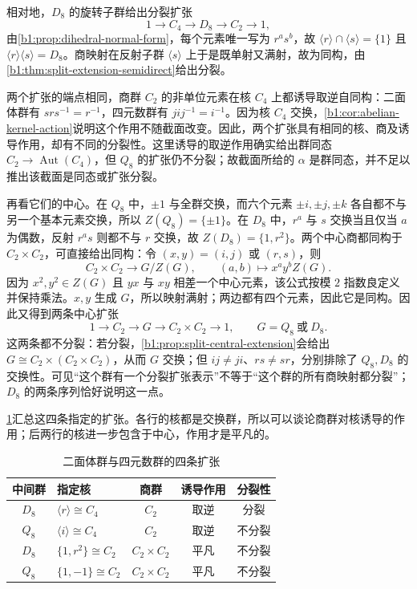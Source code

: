 \ProseParagraphBreak
相对地，\(D_8\) 的旋转子群给出分裂扩张
\[
	1\longrightarrow C_4\longrightarrow D_8\longrightarrow C_2\longrightarrow1,
\]
由\cref{b1:prop:dihedral-normal-form}，每个元素唯一写为 \(r^as^b\)，故 \(\langle r\rangle\cap\langle s\rangle=\{1\}\) 且 \(\langle r\rangle\langle s\rangle=D_8\)。商映射在反射子群 \(\langle s\rangle\) 上于是既单射又满射，故为同构，由\cref{b1:thm:split-extension-semidirect}给出分裂。

\ProseParagraphBreak
两个扩张的端点相同，商群 \(C_2\) 的非单位元素在核 \(C_4\) 上都诱导取逆自同构：二面体群有 \(srs^{-1}=r^{-1}\)，四元数群有 \(jij^{-1}=i^{-1}\)。因为核 \(C_4\) 交换，\cref{b1:cor:abelian-kernel-action}说明这个作用不随截面改变。因此，两个扩张具有相同的核、商及诱导作用，却有不同的分裂性。这里诱导的取逆作用确实给出群同态 \(C_2\rightarrow\operatorname{Aut}(C_4)\)，但 \(Q_8\) 的扩张仍不分裂；故截面所给的 \(\alpha\) 是群同态，并不足以推出该截面是同态或扩张分裂。

\ProseParagraphBreak
再看它们的中心。在 \(Q_8\) 中，\(\pm1\) 与全群交换，而六个元素 \(\pm i,\pm j,\pm k\) 各自都不与另一个基本元素交换，所以 \(Z(Q_8)=\{\pm1\}\)。在 \(D_8\) 中，\(r^a\) 与 \(s\) 交换当且仅当 \(a\) 为偶数，反射 \(r^as\) 则都不与 \(r\) 交换，故 \(Z(D_8)=\{1,r^2\}\)。两个中心商都同构于 \(C_2\times C_2\)，可直接给出同构：令 \((x,y)=(i,j)\) 或 \((r,s)\)，则
\[
	C_2\times C_2\longrightarrow G/Z(G),\qquad (a,b)\longmapsto x^ay^bZ(G).
\]
因为 \(x^2,y^2\in Z(G)\) 且 \(yx\) 与 \(xy\) 相差一个中心元素，该公式按模 \(2\) 指数良定义并保持乘法。\(x,y\) 生成 \(G\)，所以映射满射；两边都有四个元素，因此它是同构。因此又得到两条中心扩张
\[
	1\longrightarrow C_2\longrightarrow G \longrightarrow C_2\times C_2\longrightarrow1, \qquad G=Q_8\ \text{或}\ D_8.
\]
这两条都不分裂：若分裂，\cref{b1:prop:split-central-extension}会给出 \(G\cong C_2\times(C_2\times C_2)\)，从而 \(G\) 交换；但 \(ij\neq ji\)、\(rs\neq sr\)，分别排除了 \(Q_8,D_8\) 的交换性。可见“这个群有一个分裂扩张表示”不等于“这个群的所有商映射都分裂”；\(D_8\) 的两条序列恰好说明这一点。

\ProseParagraphBreak
\cref{b1:tab:dihedral-quaternion-extensions}汇总这四条指定的扩张。各行的核都是交换群，所以可以谈论商群对核诱导的作用；后两行的核进一步包含于中心，作用才是平凡的。

\begin{table}[htbp]
	\centering
	\caption{二面体群与四元数群的四条扩张}
	\label{b1:tab:dihedral-quaternion-extensions}
	\begin{tabularx}{\linewidth}{@{}c>{\raggedright\arraybackslash}Xccc@{}}
		\toprule
		中间群 & 指定核 & 商群 & 诱导作用 & 分裂性 \\
		\midrule
		\(D_8\) & \(\langle r\rangle\cong C_4\) & \(C_2\) & 取逆 & 分裂 \\
		\(Q_8\) & \(\langle i\rangle\cong C_4\) & \(C_2\) & 取逆 & 不分裂 \\
		\(D_8\) & \(\{1,r^2\}\cong C_2\) & \(C_2\times C_2\) & 平凡 & 不分裂 \\
		\(Q_8\) & \(\{1,-1\}\cong C_2\) & \(C_2\times C_2\) & 平凡 & 不分裂 \\
		\bottomrule
	\end{tabularx}
\end{table}

